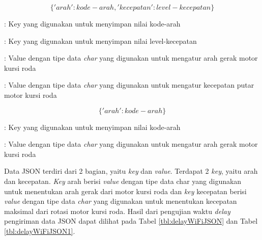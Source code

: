 \begin{equation}
  \label{eq:json-2Data}
    \{'arah': kode-arah, 'kecepatan': level-kecepatan\}
\end{equation}

\begin{description}[nolistsep]
  \item[Keterangan]
  \item[arah] : Key yang digunakan untuk menyimpan nilai kode-arah
  \item[kecepatan] : Key yang digunakan untuk menyimpan nilai level-kecepatan
  \item[kode-arah] : Value dengan tipe data \emph{char} yang digunakan untuk mengatur arah gerak motor kursi roda
  \item[level-kecepatan] : Value dengan tipe data \emph{char} yang digunakan untuk mengatur kecepatan putar motor kursi roda 
\end{description}

\begin{equation}
  \label{eq:json-1Data}
    \{'arah': kode-arah\}
\end{equation}

\begin{description}[nolistsep]
  \item[Keterangan]
  \item[arah] : Key yang digunakan untuk menyimpan nilai kode-arah
  \item[kode-arah] : Value dengan tipe data \emph{char} yang digunakan untuk mengatur arah gerak motor kursi roda 
\end{description}

Data JSON terdiri dari 2 bagian, yaitu \emph{key} dan \emph{value}. Terdapat 2 \emph{key}, yaitu arah dan kecepatan. \emph{Key} arah berisi \emph{value} dengan tipe data char yang digunakan untuk menentukan arah gerak dari motor kursi roda dan \emph{key} kecepatan berisi \emph{value} dengan tipe data \emph{char} yang digunakan untuk menentukan kecepatan maksimal dari rotasi motor kursi roda. Hasil dari pengujian waktu \emph{delay} pengiriman data JSON dapat dilihat pada Tabel \ref{tbl:delayWiFiJSON} dan Tabel \ref{tbl:delayWiFiJSON1}.

